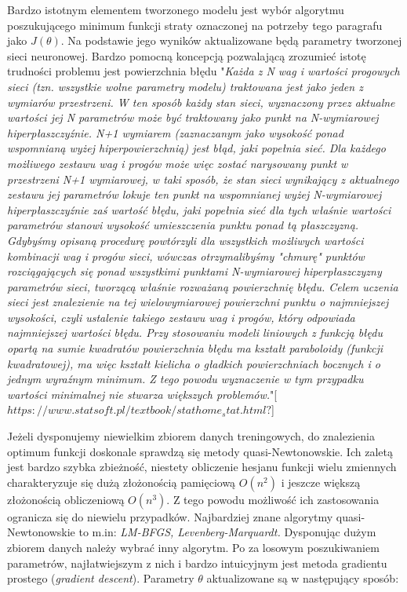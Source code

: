\documentclass[11pt]{book}
\theoremstyle{definition}
\begin{document}
Bardzo istotnym elementem tworzonego modelu jest wybór algorytmu poszukującego minimum funkcji straty oznaczonej na potrzeby tego paragrafu jako $J(\theta)$. Na podstawie jego wyników aktualizowane będą parametry tworzonej sieci neuronowej. Bardzo pomocną koncepcją pozwalającą zrozumieć istotę trudności problemu jest powierzchnia błędu "\textit{Każda z N wag i wartości progowych sieci (tzn. wszystkie wolne parametry modelu) traktowana jest jako jeden z wymiarów przestrzeni. W ten sposób każdy stan sieci, wyznaczony przez aktualne wartości jej N parametrów może być traktowany jako punkt na N-wymiarowej hiperpłaszczyźnie. N+1 wymiarem (zaznaczanym jako wysokość ponad wspomnianą wyżej hiperpowierzchnią) jest błąd, jaki popełnia sieć. Dla każdego możliwego zestawu wag i progów może więc zostać narysowany punkt w przestrzeni N+1 wymiarowej, w taki sposób, że stan sieci wynikający z aktualnego zestawu jej parametrów lokuje ten punkt na wspomnianej wyżej N-wymiarowej hiperpłaszczyźnie zaś wartość błędu, jaki popełnia sieć dla tych właśnie wartości parametrów stanowi wysokość umieszczenia punktu ponad tą płaszczyzną. Gdybyśmy opisaną procedurę powtórzyli dla wszystkich możliwych wartości kombinacji wag i progów sieci, wówczas otrzymalibyśmy "chmurę" punktów rozciągających się ponad wszystkimi punktami N-wymiarowej hiperpłaszczyzny parametrów sieci, tworzącą właśnie rozważaną powierzchnię błędu. Celem uczenia sieci jest znalezienie na tej wielowymiarowej powierzchni punktu o najmniejszej wysokości, czyli ustalenie takiego zestawu wag i progów, który odpowiada najmniejszej wartości błędu.
	Przy stosowaniu modeli liniowych z funkcją błędu opartą na sumie kwadratów powierzchnia błędu ma kształt paraboloidy (funkcji kwadratowej), ma więc kształt kielicha o gładkich powierzchniach bocznych i o jednym wyraźnym minimum. Z tego powodu wyznaczenie w tym przypadku wartości minimalnej nie stwarza większych problemów.}"[$https://www.statsoft.pl/textbook/stathome_stat.html?$]

Jeżeli dysponujemy niewielkim zbiorem danych treningowych, do znalezienia optimum funkcji doskonale sprawdzą się metody quasi-Newtonowskie. Ich zaletą jest bardzo szybka zbieżność, niestety obliczenie hesjanu funkcji wielu zmiennych charakteryzuje się dużą złożonością pamięciową $O(n^2)$ i jeszcze większą złożonością obliczeniową $O(n^3)$. Z tego powodu możliwość ich zastosowania ogranicza się do niewielu przypadków. Najbardziej znane algorytmy quasi-Newtonowskie to m.in: \textit{LM-BFGS, Levenberg-Marquardt.} Dysponując dużym zbiorem danych należy wybrać inny algorytm. Po za losowym poszukiwaniem parametrów, najłatwiejszym z nich i bardzo intuicyjnym jest metoda gradientu prostego (\textit{gradient descent}). Parametry $\theta$ aktualizowane są w następujący sposób:
\end{document}
